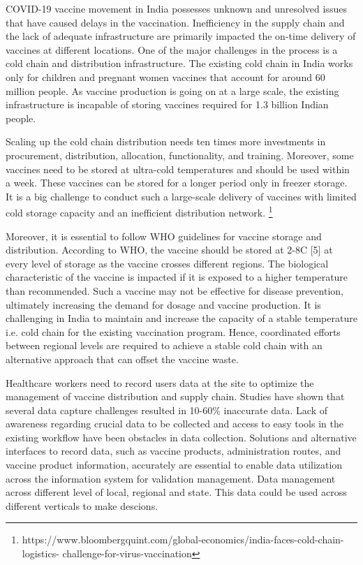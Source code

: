 \documentclass{article}
\begin{document}
COVID-19 vaccine movement in India possesses unknown and unresolved issues that have caused delays in the vaccination. Inefficiency in the supply chain and the lack of adequate infrastructure are primarily impacted the on-time delivery of vaccines at different locations. One of the major challenges in the process is a cold chain and distribution infrastructure. The existing cold chain in India works only for children and pregnant women vaccines that account for around 60 million people. As vaccine production is going on at a large scale, the existing infrastructure is incapable of storing vaccines required for 1.3 billion Indian people.  

Scaling up the cold chain distribution needs ten times more investments in procurement, distribution, allocation, functionality, and training. Moreover, some vaccines need to be stored at ultra-cold temperatures and should be used within a week. These vaccines can be stored for a longer period only in freezer storage. It is a big challenge to conduct such a large-scale delivery of vaccines with limited cold storage capacity and an inefficient distribution network. \footnote {https://www.bloombergquint.com/global-economics/india-faces-cold-chain-logistics- challenge-for-virus-vaccination}         

Moreover, it is essential to follow WHO guidelines for vaccine storage and distribution. According to WHO, the vaccine should be stored at 2-8\degree C [5] at every level of storage as the vaccine crosses different regions. The biological characteristic of the vaccine is impacted if it is exposed to a higher temperature than recommended. Such a vaccine may not be effective for disease prevention, ultimately increasing the demand for dosage and vaccine production. It is challenging in India to maintain and increase the capacity of a stable temperature i.e. cold chain for the existing vaccination program. Hence, coordinated efforts between regional levels are required to achieve a stable cold chain with an alternative approach that can offset the vaccine waste. 

Healthcare workers need to record users data at the site to optimize the management of vaccine distribution and supply chain. Studies have shown that several data capture challenges resulted in 10-60\% inaccurate data\cite{atkinson2020digital}. Lack of awareness regarding crucial data to be collected and access to easy tools in the existing workflow have been obstacles in data collection. Solutions and alternative interfaces to record data, such as vaccine products, administration routes, and vaccine product information, accurately are essential to enable data utilization across the information system for validation management. Data management across different level of local, regional and state. This data could be used across different verticals to make descions.
\end{document}

